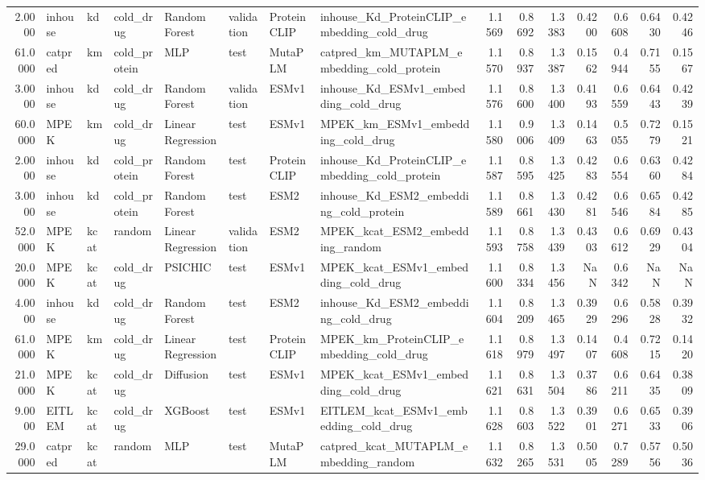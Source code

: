 \begin{tabular}{rlllllllrrrrrrr}
2.0000 & inhouse & kd & cold_drug & Random Forest & validation & ProteinCLIP & inhouse_Kd_ProteinCLIP_embedding_cold_drug & 1.1569 & 0.8692 & 1.3383 & 0.4200 & 0.6608 & 0.6430 & 0.4246 \\
61.0000 & catpred & km & cold_protein & MLP & test & MutaPLM & catpred_km_MUTAPLM_embedding_cold_protein & 1.1570 & 0.8937 & 1.3387 & 0.1562 & 0.4944 & 0.7155 & 0.1567 \\
3.0000 & inhouse & kd & cold_drug & Random Forest & validation & ESMv1 & inhouse_Kd_ESMv1_embedding_cold_drug & 1.1576 & 0.8600 & 1.3400 & 0.4193 & 0.6559 & 0.6443 & 0.4239 \\
60.0000 & MPEK & km & cold_drug & Linear Regression & test & ESMv1 & MPEK_km_ESMv1_embedding_cold_drug & 1.1580 & 0.9006 & 1.3409 & 0.1463 & 0.5055 & 0.7279 & 0.1521 \\
2.0000 & inhouse & kd & cold_protein & Random Forest & test & ProteinCLIP & inhouse_Kd_ProteinCLIP_embedding_cold_protein & 1.1587 & 0.8595 & 1.3425 & 0.4283 & 0.6554 & 0.6360 & 0.4284 \\
3.0000 & inhouse & kd & cold_protein & Random Forest & test & ESM2 & inhouse_Kd_ESM2_embedding_cold_protein & 1.1589 & 0.8661 & 1.3430 & 0.4281 & 0.6546 & 0.6584 & 0.4285 \\
52.0000 & MPEK & kcat & random & Linear Regression & validation & ESM2 & MPEK_kcat_ESM2_embedding_random & 1.1593 & 0.8758 & 1.3439 & 0.4303 & 0.6612 & 0.6929 & 0.4304 \\
20.0000 & MPEK & kcat & cold_drug & PSICHIC & test & ESMv1 & MPEK_kcat_ESMv1_embedding_cold_drug & 1.1600 & 0.8334 & 1.3456 & NaN & 0.6342 & NaN & NaN \\
4.0000 & inhouse & kd & cold_drug & Random Forest & test & ESM2 & inhouse_Kd_ESM2_embedding_cold_drug & 1.1604 & 0.8209 & 1.3465 & 0.3929 & 0.6296 & 0.5828 & 0.3932 \\
61.0000 & MPEK & km & cold_drug & Linear Regression & test & ProteinCLIP & MPEK_km_ProteinCLIP_embedding_cold_drug & 1.1618 & 0.8979 & 1.3497 & 0.1407 & 0.4608 & 0.7215 & 0.1420 \\
21.0000 & MPEK & kcat & cold_drug & Diffusion & test & ESMv1 & MPEK_kcat_ESMv1_embedding_cold_drug & 1.1621 & 0.8631 & 1.3504 & 0.3786 & 0.6211 & 0.6435 & 0.3809 \\
9.0000 & EITLEM & kcat & cold_drug & XGBoost & test & ESMv1 & EITLEM_kcat_ESMv1_embedding_cold_drug & 1.1628 & 0.8603 & 1.3522 & 0.3901 & 0.6271 & 0.6533 & 0.3906 \\
29.0000 & catpred & kcat & random & MLP & test & MutaPLM & catpred_kcat_MUTAPLM_embedding_random & 1.1632 & 0.8265 & 1.3531 & 0.5005 & 0.7289 & 0.5756 & 0.5036 \\

\end{tabular}
